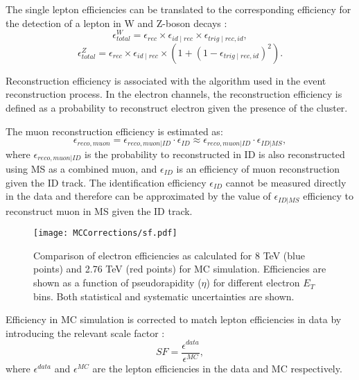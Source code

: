 The single lepton efficiencies can be translated to the corresponding efficiency for the detection of a lepton in W and Z-boson decays :
\begin{equation}
\epsilon^{W}_{total}=\epsilon_{rec} \times \epsilon_{id \mid rec} \times \epsilon_{trig \mid rec,id},
\end{equation}
\begin{equation}
\epsilon^{Z}_{total}=\epsilon_{rec} \times \epsilon_{id \mid rec} \times (1+(1-\epsilon_{trig \mid rec,id})^2).
\end{equation}

Reconstruction efficiency is associated with the algorithm used in the event reconstruction process. In the electron channels, the reconstruction efficiency is defined as a probability to reconstruct electron given the presence of the cluster.  

The muon reconstruction efficiency is estimated as:
\begin{equation}
\epsilon_{reco,muon} = \epsilon_{reco,muon|ID} \cdot \epsilon_{ID} \approx \epsilon_{reco,muon|ID} \cdot \epsilon_{ID|MS},
\end{equation}
where $\epsilon_{reco,muon|ID}$ is the probability to reconstructed in ID is also reconstructed using MS as a combined muon, and  $\epsilon_{ID}$ is an efficiency of muon reconstruction given the ID track. The identification efficiency $\epsilon_{ID}$ cannot be measured directly  in the data and therefore can be approximated by the value of $\epsilon_{ID|MS}$ efficiency to reconstruct muon in MS given the ID track. 



\begin{figure}[!tbp]
\centering
\texttt{[image: MCCorrections/sf.pdf]}
\caption{Comparison of electron efficiencies as calculated for 8 TeV (blue points) and 2.76 TeV (red points) for MC simulation. Efficiencies are shown as a function of pseudorapidity ($\eta$) for different electron $E_T$ bins. Both statistical and systematic uncertainties are shown\cite{ElecEff}. }
\label{eff_comp}
\end{figure}

Efficiency in MC simulation is corrected to match lepton efficiencies in data by introducing the relevant scale factor :
\begin{equation}
SF=\frac{\epsilon^{data}}{\epsilon^{MC}},
\end{equation}
where $\epsilon^{data}$ and $\epsilon^{MC}$ are the lepton efficiencies in the data and MC respectively.

